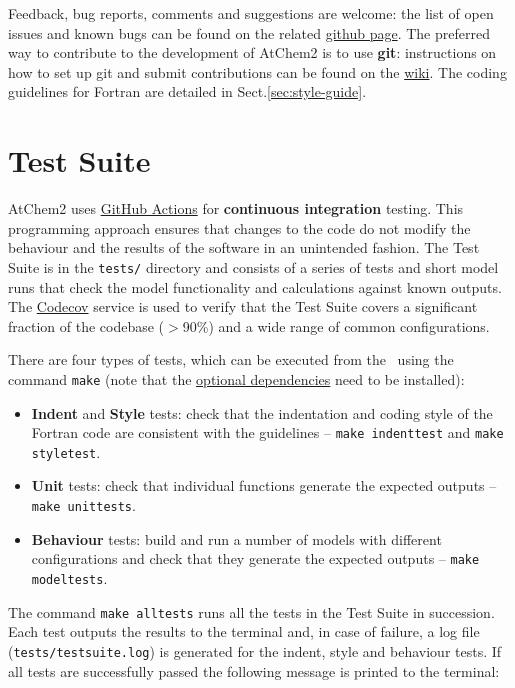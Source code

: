 Feedback, bug reports, comments and suggestions are welcome: the list
of open issues and known bugs can be found on the related
\href{https://github.com/AtChem/AtChem2/issues}{github page}. The
preferred way to contribute to the development of AtChem2 is to use
\textbf{git}: instructions on how to set up git and submit
contributions can be found on the
\href{https://github.com/AtChem/AtChem2/wiki/How-to-contribute}{wiki}.
The coding guidelines for Fortran are detailed in Sect.\ref{sec:style-guide}.

\section{Test Suite} \label{sec:test-suite}

AtChem2 uses \href{https://github.com/features/actions/}{GitHub Actions} for
\textbf{continuous integration} testing. This programming approach
ensures that changes to the code do not modify the behaviour and the
results of the software in an unintended fashion. The Test Suite is in
the \texttt{tests/} directory and consists of a series of tests and
short model runs that check the model functionality and calculations
against known outputs. The \href{https://codecov.io/}{Codecov} service
is used to verify that the Test Suite covers a significant fraction of
the codebase ($>$90\%) and a wide range of common configurations.

There are four types of tests, which can be executed from the
\maindir\ using the command \verb|make| (note that the
\hyperref[subsec:optional-dependencies]{optional dependencies} need to
be installed):

\begin{itemize}
\item \textbf{Indent} and \textbf{Style} tests: check that the
  indentation and coding style of the Fortran code are consistent with
  the guidelines -- \verb|make indenttest| and \verb|make styletest|.
\item \textbf{Unit} tests: check that individual functions generate
  the expected outputs -- \verb|make unittests|.
\item \textbf{Behaviour} tests: build and run a number of models with
  different configurations and check that they generate the expected
  outputs -- \verb|make modeltests|.
\end{itemize}

The command \verb|make alltests| runs all the tests in the Test Suite
in succession. Each test outputs the results to the terminal and, in
case of failure, a log file (\texttt{tests/testsuite.log}) is
generated for the indent, style and behaviour tests. If all tests are
successfully passed the following message is printed to the terminal:

